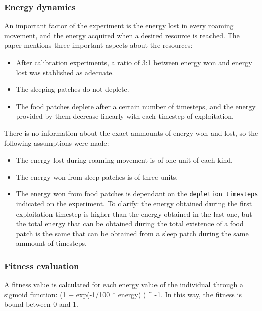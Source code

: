 \documentclass[11pt]{article}
\providecommand{\tightlist}{%
      \setlength{\itemsep}{0pt}\setlength{\parskip}{0pt}}
\begin{document}
    \hypertarget{energy-dynamics}{%
\subsubsection{Energy dynamics}\label{energy-dynamics}}

An important factor of the experiment is the energy lost in every
roaming movement, and the energy acquired when a desired resource is
reached. The paper mentions three important aspects about the resources:

\begin{itemize}
\tightlist
\item
  After calibration experiments, a ratio of 3:1 between energy won and
  energy lost was stablished as adecuate.
\item
  The sleeping patches do not deplete.
\item
  The food patches deplete after a certain number of timesteps, and the
  energy provided by them decrease linearly with each timestep of
  exploitation.
\end{itemize}

There is no information about the exact ammounts of energy won and lost,
so the following assumptions were made:

\begin{itemize}
\tightlist
\item
  The energy lost during roaming movement is of one unit of each kind.
\item
  The energy won from sleep patches is of three units.
\item
  The energy won from food patches is dependant on the
  \texttt{depletion\ timesteps} indicated on the experiment. To clarify:
  the energy obtained during the first exploitation timestep is higher
  than the energy obtained in the last one, but the total energy that
  can be obtained during the total existence of a food patch is the same
  that can be obtained from a sleep patch during the same ammount of
  timesteps.
\end{itemize}

    \hypertarget{fitness-evaluation}{%
\subsubsection{Fitness evaluation}\label{fitness-evaluation}}

A fitness value is calculated for each energy value of the individual
through a sigmoid function: (1 + exp(-1/100 * energy) ) \^{} -1. In this
way, the fitness is bound between 0 and 1.
\end{document}
